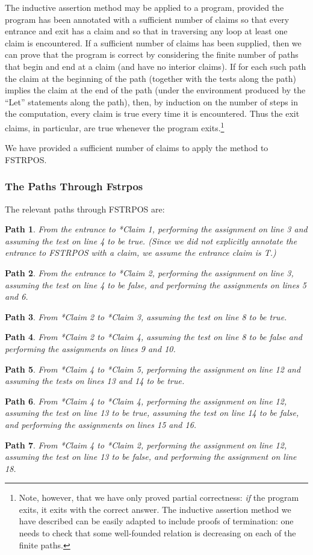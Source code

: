 \documentclass[10pt]{book}
\newtheorem{path}{Path}
\begin{document}
The inductive assertion method may be applied to a program, provided the
program has been annotated with a sufficient number of claims so that
every entrance and exit has a claim and so that in traversing
any loop at least one claim is encountered.  If a sufficient
number of claims has been supplied, then we can prove that the program
is correct by considering the finite number of paths that begin and end at a
claim (and have no interior claims).  If for each such path
the claim at the beginning of the path (together with the
tests along the path) implies the claim at the end of the path
(under the environment produced by the ``Let'' statements
along the path), then, by induction on the number of steps
in the computation, every claim is true every time it is encountered.
Thus the exit claims, in particular, are true whenever the
program exits.\footnote{Note, however, that we have only proved partial correctness:  \emph{if} the program exits, it exits with the correct answer.  The inductive assertion method we have described can be easily adapted to include proofs of termination:  one needs to check that some well-founded relation is decreasing on each of the finite paths.}

We have provided a sufficient number of claims to apply the method
to FSTRPOS.

\subsubsection{The Paths Through Fstrpos}
The relevant paths through FSTRPOS are:
\begin{path}From the entrance to *Claim 1,
performing the assignment on line 3 and
assuming the test on line 4 to be true.  (Since we did not
explicitly annotate the entrance to FSTRPOS with a claim,
we assume the entrance claim is T.)
\end{path}
\begin{path}From the entrance to *Claim 2,
performing the assignment on line 3,
assuming the test on line 4 to be false, and
performing the assignments on lines 5 and 6.
\end{path}
\begin{path}From *Claim 2 to *Claim 3,
assuming the test on line 8 to be true.
\end{path}
\begin{path}From *Claim 2 to *Claim 4,
assuming the test on line 8 to be false and performing
the assignments on lines 9 and 10.
\end{path}
\begin{path}From *Claim 4 to *Claim 5,
performing the assignment on line 12 and assuming
the tests on lines 13 and 14 to be true.
\end{path}
\begin{path}From *Claim 4 to *Claim 4,
performing the assignment on line 12, assuming
the test on line 13 to be true, assuming the test on line 14 to be false,
and performing the assignments on lines 15 and 16.
\end{path}
\begin{path}From *Claim 4 to *Claim 2,
performing the assignment on line 12, assuming
the test on line 13 to be false, and performing the assignment
on line 18.
\end{path}
\end{document}
